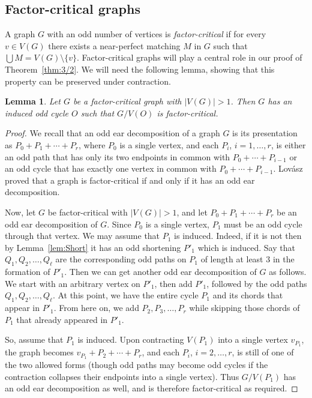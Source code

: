 \documentclass[10pt,a4paper]{amsart}
\newtheorem{lemma}[theorem]{Lemma}
\begin{document}
\subsection{Factor-critical graphs}
A graph $G$ with an odd number of vertices is \emph{factor-critical} if for every $v \in V(G)$ there exists a near-perfect matching $M$ in $G$ such that $\bigcup M = V(G) \setminus \{v\}$. Factor-critical graphs will play a central role in our proof of Theorem~\ref{thm:3/2}. We will need the following lemma, showing that this property can be preserved under contraction.
\begin{lemma} \label{lem:Ind}
Let $G$ be a factor-critical graph with $|V(G)| > 1$. Then $G$ has an induced odd cycle $O$ such that $G/V(O)$ is factor-critical.
\end{lemma}
\begin{proof} We recall that an odd ear decomposition of a graph $G$ is its presentation as $P_0 + P_1 + \cdots + P_r$, where $P_0$ is a single vertex, and each $P_i$, $i=1, \ldots , r$, is either an odd path that has only its two endpoints in common with $P_0 + \cdots + P_{i-1}$ or an odd cycle that has exactly one vertex in common with $P_0 + \cdots + P_{i-1}$. Lov\'asz~\cite{Lo2} proved that a graph is factor-critical if and only if it has an odd ear decomposition.

Now, let $G$ be factor-critical with $|V(G)| > 1$, and let $P_0 + P_1 + \cdots + P_r$ be an odd ear decomposition of $G$. Since $P_0$ is a single vertex, $P_1$ must be an odd cycle through that vertex. We may assume that $P_1$ is induced. Indeed, if it is not then by Lemma~\ref{lem:Short} it has an odd shortening $P'_1$ which is induced. Say that $Q_1, Q_2, \ldots , Q_{\ell}$ are the corresponding odd paths on $P_1$ of length at least $3$ in the formation of $P'_1$. Then we can get another odd ear decomposition of $G$ as follows. We start with an arbitrary vertex on $P'_1$, then add $P'_1$, followed by the odd paths $Q_1, Q_2, \ldots , Q_{\ell}$. At this point, we have the entire cycle $P_1$ and its chords that appear in $P'_1$. From here on, we add $P_2, P_3, \ldots , P_r$ while skipping those chords of $P_1$ that already appeared in $P'_1$.

So, assume that $P_1$ is induced. Upon contracting $V(P_1)$ into a single vertex $v_{P_1}$, the graph becomes $v_{P_1} + P_2 + \cdots + P_r$, and each $P_i$, $i=2, \ldots , r$, is still of one of the two allowed forms (though odd paths may become odd cycles if the contraction collapses their endpoints into a single vertex). Thus $G/V(P_1)$ has an odd ear decomposition as well, and is therefore factor-critical as required.
\end{proof}
\end{document}
